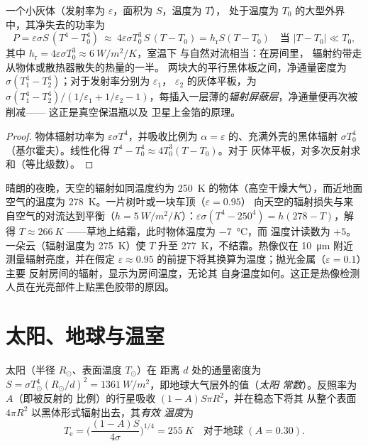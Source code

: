 \begin{proposition}[净交换与辐射换热系数]\label{prop:b2:thermal-radiation:exchange}
一个小灰体（发射率为 $\varepsilon$，面积为 $S$，温度为 $T$），
处于温度为 $T_0$ 的大型外界中，其净失去的功率为
\[
P = \varepsilon\sigma S\,(T^4 - T_0^4)
\ \approx\ 4\varepsilon\sigma T_0^3\,S\,(T - T_0) = h_{\text{r}}S(T - T_0)
\quad\text{当 } |T - T_0| \ll T_0 ,
\]
其中 $h_{\text{r}} = 4\varepsilon\sigma T_0^3 \approx \qty{6}{W/m^2/K}$，室温下
与自然对流相当：在房间里，
辐射约带走从物体或散热器散失的热量的一半。
两块大的平行黑体板之间，净通量密度为
$\sigma(T_1^4 - T_2^4)$；对于发射率分别为 $\varepsilon_1$，
$\varepsilon_2$ 的灰体平板，为 $\sigma(T_1^4 - T_2^4)/(1/\varepsilon_1 + 1/\varepsilon_2
- 1)$，每插入一层薄的\emph{辐射屏蔽层}，净通量便再次被削减——
这正是真空保温瓶以及
卫星上金箔的原理。
\end{proposition}

\begin{proof}
物体辐射功率为 $\varepsilon\sigma T^4$，并吸收比例为 $\alpha =
\varepsilon$ 的、充满外壳的黑体辐射 $\sigma T_0^4$
（基尔霍夫）。线性化得 $T^4 - T_0^4 \approx 4T_0^3(T - T_0)$。对于
灰体平板，对多次反射求和（等比级数）。
\end{proof}

\begin{example}[晴朗夜空下的霜与热像仪]\label{ex:b2:thermal-radiation:frost}
晴朗的夜晚，天空的辐射如同温度约为 \qty{250}{K}
的物体（高空干燥大气），而近地面空气的温度为
\qty{278}{K}。一片树叶或一块车顶（$\varepsilon = 0.95$）
向天空的辐射损失与来自空气的对流达到平衡（$h =
\qty{5}{W/m^2/K}$）：$\varepsilon\sigma(T^4 - 250^4) = h(278 - T)$，解得 $T
\approx \qty{266}{K}$ ——草地上结霜，此时物体温度为 \qty{-7}{\celsius}，而
温度计读数为 $+5$。一朵云（辐射温度为 \qty{275}{K}）使 $T$
升至 \qty{277}{K}，不结霜。热像仪在
\qty{10}{\micro m} 附近测量辐射亮度，并在假定
$\varepsilon \approx 0.95$ 的前提下将其换算为温度；抛光金属（$\varepsilon = 0.1$）主要
反射房间的辐射，显示为房间温度，无论其
自身温度如何。这正是热像检测人员在光亮部件上贴黑色胶带的原因。
\end{example}

\section{太阳、地球与温室}

\begin{proposition}[太阳常数与有效温度]\label{prop:b2:thermal-radiation:earth}
太阳（半径 $R_\odot$、表面温度 $T_\odot$）在
距离 $d$ 处的通量密度为 $S = \sigma T_\odot^4 (R_\odot/d)^2 =
\qty{1361}{W/m^2}$，即地球大气层外的值（\emph{太阳
常数}）。反照率为 $A$（即被反射的
比例）的行星吸收 $(1 - A)S\pi R^2$，并在稳态下将其
从整个表面 $4\pi R^2$ 以黑体形式辐射出去，其\emph{有效
温度}为
\[
T_{\text{e}} = \Big(\frac{(1 - A)S}{4\sigma}\Big)^{1/4} = \qty{255}{K}
\quad\text{对于地球 } (A = 0.30) .
\]
\end{proposition}

